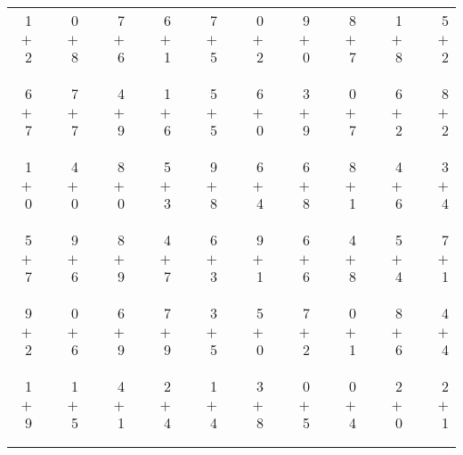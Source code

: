 \documentclass[12pt, letterpaper]{article}
\begin{document}
\begin{tabular}{rrrrrrrrrrrrrrrrrrr}
1 & & 0 & & 7 & & 6 & & 7 & & 0 & & 9 & & 8 & & 1 & & 5\\
$+$ 2 & & $+$ 8 & & $+$ 6 & & $+$ 1 & & $+$ 5 & & $+$ 2 & & $+$ 0 & & $+$ 7 & & $+$ 8 & & $+$ 2\\
\cline{1-1} \cline{3-3} \cline{5-5} \cline{7-7} \cline{9-9} \cline{11-11} \cline{13-13} \cline{15-15} \cline{17-17} \cline{19-19} \\ \\
6 & & 7 & & 4 & & 1 & & 5 & & 6 & & 3 & & 0 & & 6 & & 8\\
$+$ 7 & & $+$ 7 & & $+$ 9 & & $+$ 6 & & $+$ 5 & & $+$ 0 & & $+$ 9 & & $+$ 7 & & $+$ 2 & & $+$ 2\\
\cline{1-1} \cline{3-3} \cline{5-5} \cline{7-7} \cline{9-9} \cline{11-11} \cline{13-13} \cline{15-15} \cline{17-17} \cline{19-19} \\ \\
1 & & 4 & & 8 & & 5 & & 9 & & 6 & & 6 & & 8 & & 4 & & 3\\
$+$ 0 & & $+$ 0 & & $+$ 0 & & $+$ 3 & & $+$ 8 & & $+$ 4 & & $+$ 8 & & $+$ 1 & & $+$ 6 & & $+$ 4\\
\cline{1-1} \cline{3-3} \cline{5-5} \cline{7-7} \cline{9-9} \cline{11-11} \cline{13-13} \cline{15-15} \cline{17-17} \cline{19-19} \\ \\
5 & & 9 & & 8 & & 4 & & 6 & & 9 & & 6 & & 4 & & 5 & & 7\\
$+$ 7 & & $+$ 6 & & $+$ 9 & & $+$ 7 & & $+$ 3 & & $+$ 1 & & $+$ 6 & & $+$ 8 & & $+$ 4 & & $+$ 1\\
\cline{1-1} \cline{3-3} \cline{5-5} \cline{7-7} \cline{9-9} \cline{11-11} \cline{13-13} \cline{15-15} \cline{17-17} \cline{19-19} \\ \\
9 & & 0 & & 6 & & 7 & & 3 & & 5 & & 7 & & 0 & & 8 & & 4\\
$+$ 2 & & $+$ 6 & & $+$ 9 & & $+$ 9 & & $+$ 5 & & $+$ 0 & & $+$ 2 & & $+$ 1 & & $+$ 6 & & $+$ 4\\
\cline{1-1} \cline{3-3} \cline{5-5} \cline{7-7} \cline{9-9} \cline{11-11} \cline{13-13} \cline{15-15} \cline{17-17} \cline{19-19} \\ \\
1 & & 1 & & 4 & & 2 & & 1 & & 3 & & 0 & & 0 & & 2 & & 2\\
$+$ 9 & & $+$ 5 & & $+$ 1 & & $+$ 4 & & $+$ 4 & & $+$ 8 & & $+$ 5 & & $+$ 4 & & $+$ 0 & & $+$ 1\\
\cline{1-1} \cline{3-3} \cline{5-5} \cline{7-7} \cline{9-9} \cline{11-11} \cline{13-13} \cline{15-15} \cline{17-17} \cline{19-19} \\ \\

\end{tabular}
\end{document}
